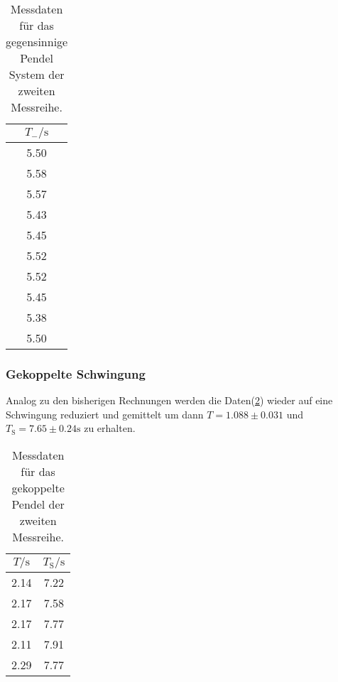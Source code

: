             \begin{table}[ht]
                \centering
                \caption{Messdaten für das gegensinnige Pendel System der zweiten Messreihe.}
                \label{tab:geg2}
                \begin{tabular}{c }
                 \toprule
                 $T_- / \si{\s}$ \\
                 \midrule
                 5.50  \\ 
                 5.58  \\ 
                 5.57  \\ 
                 5.43  \\ 
                 5.45  \\ 
                 5.52  \\ 
                 5.52  \\ 
                 5.45  \\ 
                 5.38  \\ 
                 5.50  \\ 
                \end{tabular}
            \end{table}

        \subsubsection{Gekoppelte Schwingung}

            \noindent Analog zu den bisherigen Rechnungen werden die Daten(\ref{tab:gek2}) wieder auf eine Schwingung reduziert und gemittelt um 
            dann $T = 1.088 \pm 0.031 $ und $T_{\text{S}} =7.65 \pm 0.24 \si{\second}$ zu erhalten.

            \begin{table}[ht]
                \centering
                \caption{Messdaten für das gekoppelte Pendel der zweiten Messreihe.}
                \label{tab:gek2}
                \begin{tabular}{c c}
                 \toprule
                 $T / \si{\s}$ & $T_{\text{S}} / \si{\s}$\\
                 \midrule
                 2.14  &  7.22 \\
                 2.17  &  7.58 \\
                 2.17  &  7.77 \\
                 2.11  &  7.91 \\
                 2.29  &  7.77 \\
                 \bottomrule
                \end{tabular}
            \end{table}

